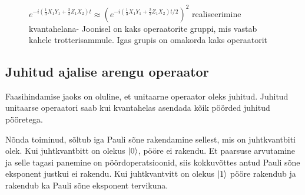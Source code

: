 \documentclass[12pt]{report}
\def\paren#1{\left(#1\right)}
\def\ket#1{\mathinner{|#1\rangle}}
\begin{document}
\begin{figure}
    \centering
    \ifdefined\yquanton
    \fi
    \caption{\(e^{-i\paren{\frac{1}{3}X_1Y_1+\frac{2}{3}Z_1X_2} t} \approx \paren{e^{-i\paren{\frac{1}{3}X_1Y_1+\frac{2}{3}Z_1X_2} t/2}}^2\) realiseerimine kvantahelana-
    Joonisel on kaks operaatorite gruppi, mis vastab kahele trotterisammule.
    Igas grupis on omakorda kaks operaatorit}
    \label{fig:trotex}
\end{figure}

\subsection{Juhitud ajalise arengu operaator}

Faasihindamise jaoks on oluline, et unitaarne operaator oleks juhitud.
Juhitud unitaarse operaatori saab kui kvantahelas asendada kõik pöörded juhitud pööretega.

Nõnda toiminud, sõltub iga Pauli sõne rakendamine sellest, mis on juhtkvantbiti olek.
Kui juhtkvantbitt on olekus \(\ket0\), pööre ei rakendu.
Et paarsuse arvutamine ja selle tagasi panemine on pöördoperatsioonid, siis kokkuvõttes antud Pauli sõne eksponent justkui ei rakendu.
Kui juhtkvantvitt on olekus \(\ket1\) pööre rakendub ja rakendub ka Pauli sõne eksponent tervikuna.
\end{document}
